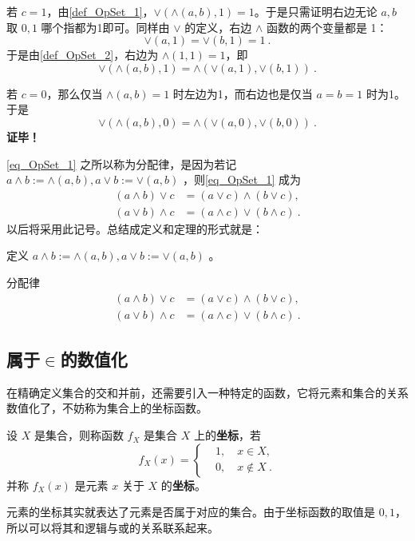 若 $c=1$，由\autoref{def_OpSet_1}，$\lor(\land(a,b),1)=1$。于是只需证明右边无论 $a,b$ 取 $0,1$ 哪个指都为1即可。同样由 $\lor$ 的定义，右边 $\land$ 函数的两个变量都是 1：
\begin{equation}
\lor(a,1)=\lor(b,1)=1~.
\end{equation}
于是由\autoref{def_OpSet_2}，右边为 $\land(1,1)=1$，即
\begin{equation}
\lor(\land(a,b),1)=\land(\lor(a,1),\lor(b,1))~.
\end{equation}

若 $c=0$，那么仅当 $\land(a,b)=1$ 时左边为1，而右边也是仅当 $a=b=1$ 时为1。于是
\begin{equation}
\lor(\land(a,b),0)=\land(\lor(a,0),\lor(b,0))~.
\end{equation}
\textbf{证毕！}

\autoref{eq_OpSet_1} 之所以称为分配律，是因为若记 $a\land b:=\land(a,b),a\lor b:=\lor(a,b)$ ，则\autoref{eq_OpSet_1} 成为
\begin{equation}
\begin{aligned}
(a\land b)\lor c&=(a\lor c)\land(b\lor c),\\
(a\lor b)\land c&=(a\land c)\lor(b\land c)~.
\end{aligned}
\end{equation}
以后将采用此记号。总结成定义和定理的形式就是：
\begin{definition}{}
定义 $a\land b:=\land(a,b),a\lor b:=\lor(a,b)$ 。
\end{definition}
\begin{theorem}{分配律}\label{the_OpSet_2}
\begin{equation}
\begin{aligned}
(a\land b)\lor c&=(a\lor c)\land(b\lor c),\\
(a\lor b)\land c&=(a\land c)\lor(b\land c)~.
\end{aligned}
\end{equation}
\end{theorem}
\subsection{属于$\in$的数值化}
在精确定义集合的交和并前，还需要引入一种特定的函数，它将元素和集合的关系数值化了，不妨称为集合上的坐标函数。
\begin{definition}{}\label{def_OpSet_6}
设 $X$ 是集合，则称函数 $f_X$ 是集合 $X$ 上的\textbf{坐标}，若
\begin{equation}\label{eq_OpSet_3}
f_X(x)=\left\{\begin{aligned}
&1,\quad x\in X,\\
&0,\quad x\notin X~.
\end{aligned}\right.
\end{equation}
并称 $f_X(x)$ 是元素 $x$ 关于 $X$ 的\textbf{坐标}。
\end{definition}
元素的坐标其实就表达了元素是否属于对应的集合。由于坐标函数的取值是 $0,1$，所以可以将其和逻辑与或的关系联系起来。


